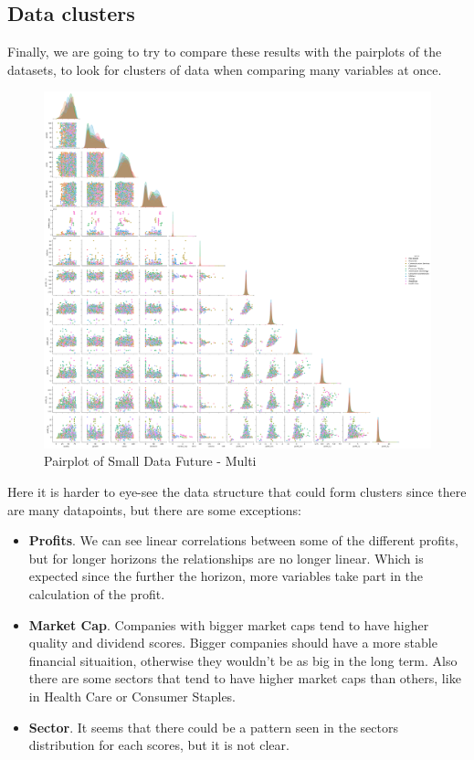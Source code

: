 \documentclass[11pt,english,a4paper,hidelinks]{book}
\begin{document}
\subsection{Data clusters}
Finally, we are going to try to compare these results with the pairplots of the datasets, to look for clusters of data when comparing many variables at once.

\begin{figure}[H]
    \centering
    \includegraphics[width=1\textwidth]{images/code/descriptive analysis/correlations/Small Data future - Multi - pairplot.png}
    \caption{Pairplot of Small Data Future - Multi}
    \label{fig:pairplot_small_data_future_multi}
\end{figure}

\noindent Here it is harder to eye-see the data structure that could form clusters since there are many datapoints, but there are some exceptions:
\begin{itemize}
    \item \textbf{Profits}. We can see linear correlations between some of the different profits, but for longer horizons the relationships are no longer linear. Which is expected since the further the horizon, more variables take part in the calculation of the profit.
    \item \textbf{Market Cap}. Companies with bigger market caps tend to have higher quality and dividend scores. Bigger companies should have a more stable financial situaition, otherwise they wouldn't be as big in the long term. Also there are some sectors that tend to have higher market caps than others, like in Health Care or Consumer Staples.
    \item \textbf{Sector}. It seems that there could be a pattern seen in the sectors distribution for each scores, but it is not clear.
\end{itemize}
\end{document}
